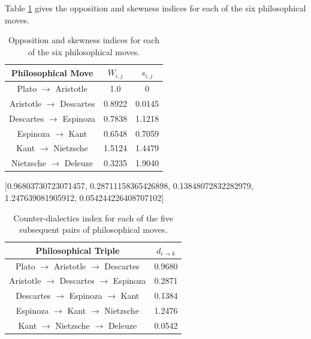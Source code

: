 \documentclass[%
 aip,
 jmp,%
 amsmath,amssymb,
 reprint,%
]{revtex4-1}
\begin{document}


Table \ref{tab:tableOI} gives the opposition and skewness indices
for each of the six philosophical moves.


\begin{table}%
\caption{\label{tab:tableOI}Opposition and skewness indices for each
of the six philosophical moves.  }

\begin{tabular}{|c||c|c|}
\hline
Philosophical Move & $W_{i,j}$ & $s_{i,j}$ \\
\hline \hline
Plato $\rightarrow$ Aristotle     &  1.0 & 0 \\
Aristotle $\rightarrow$ Descartes & 0.8922 & 0.0145 \\
Descartes $\rightarrow$ Espinoza  & 0.7838 & 1.1218 \\
Espinoza $\rightarrow$ Kant       & 0.6548 & 0.7059 \\
Kant $\rightarrow$ Nietzsche      & 1.5124 & 1.4479 \\
Nietzsche $\rightarrow$ Deleuze   & 0.3235 & 1.9040 \\
\hline
\end{tabular}
\end{table}

\begin{table}%
\caption{\label{tab:tableE} Counter-dialectics index for each
of the five subsequent pairs of philosophical moves.  }

[0.96803730723071457, 0.28711158365426898, 0.13848072832282979, 1.247639081905912, 0.054244226408707102]

\begin{tabular}{|c||c|}
\hline
Philosophical Triple & $d_{i \rightarrow k}$ \\
\hline \hline
Plato $\rightarrow$ Aristotle $\rightarrow$ Descartes &  0.9680 \\
Aristotle $\rightarrow$ Descartes $\rightarrow$ Espinoza & 0.2871 \\
Descartes $\rightarrow$ Espinoza $\rightarrow$ Kant & 0.1384 \\
Espinoza $\rightarrow$ Kant $\rightarrow$ Nietzsche & 1.2476 \\
Kant $\rightarrow$ Nietzsche $\rightarrow$ Deleuze  & 0.0542 \\
\hline
\end{tabular}
\end{table}
\end{document}
